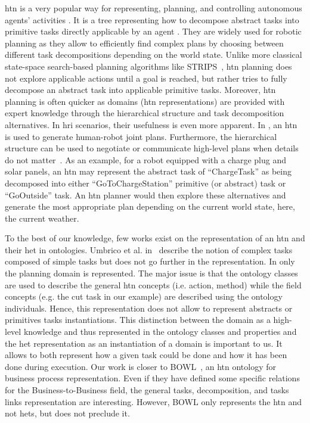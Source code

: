 \acrshort{htn} is a very popular way for representing, planning, and controlling autonomous agents' activities \cite{ghallab_2004_automated, ingrand_2017_deliberation}. It is a tree representing how to decompose abstract tasks into primitive tasks directly applicable by an agent \cite{erol_1994_htn}. They are widely used for robotic planning as they allow to efficiently find complex plans by choosing between different task decompositions depending on the world state. 
Unlike more classical state-space search-based planning algorithms like STRIPS~\cite{fikes_1971_strips}, \acrshort{htn} planning does not explore applicable actions until a goal is reached, but rather tries to fully decompose an abstract task into applicable primitive tasks. Moreover, \acrshort{htn} planning is often quicker as domains (\acrshort{htn} representations) are provided with expert knowledge through the hierarchical structure and task decomposition alternatives. 
In \acrshort{hri} scenarios, their usefulness is even more apparent. In \cite{lallement_2014_hatp}, an \acrshort{htn} is used to generate human-robot joint plans. Furthermore, the hierarchical structure can be used to negotiate or communicate high-level plans when details do not matter~\cite{milliez_2016_using}. As an example, for a robot equipped with a charge plug and solar panels, an \acrshort{htn} may represent the abstract task of ``ChargeTask'' as being decomposed into either ``GoToChargeStation'' primitive (or abstract) task or ``GoOutside'' task. An \acrshort{htn} planner would then explore these alternatives and generate the most appropriate plan depending on the current world state, here, the current weather.

To the best of our knowledge, few works exist on the representation of an \acrshort{htn} and their \acrfull{het} in ontologies. Umbrico et al. in~\cite{umbrico_2020_ontology} describe the notion of complex tasks composed of simple tasks but does not go further in the representation. In \cite{freitas_2014_using} only the planning domain is represented. The major issue is that the ontology classes are used to describe the general \acrshort{htn} concepts (i.e. action, method) while the field concepts (e.g. the cut task in our example) are described using the ontology individuals. Hence, this representation does not allow to represent abstracts or primitives tasks instantiations. This distinction between the domain as a high-level knowledge and thus represented in the ontology classes and properties and the \acrshort{het} representation as an instantiation of a domain is important to us. It allows to both represent how a given task could be done and how it has been done during execution. Our work is closer to BOWL~\cite{ko_2011_business}, an \acrshort{htn} ontology for business process representation. Even if they have defined some specific relations for the Business-to-Business field, the general tasks, decomposition, and tasks links representation are interesting. However, BOWL only represents the \acrshort{htn} and not \acrshort{het}s, but does not preclude it.

